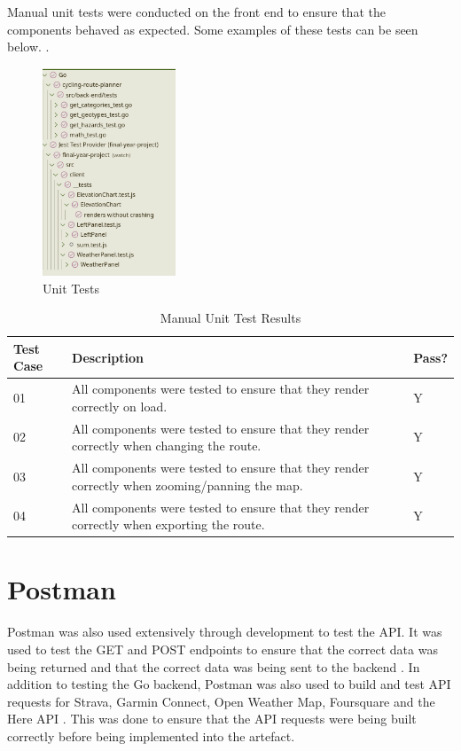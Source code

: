 Manual unit tests were conducted on the front end to ensure that the components behaved as expected. Some examples of these tests can be seen below. .

\begin{figure}[!ht]
  \centering
  \includegraphics[width=150px]{figures/unit-tests.png}
  \caption{Unit Tests}
  \label{fig:unit-tests}
\end{figure}

\begin{table}[!h]
\caption{Manual Unit Test Results}
\label{tab:unit-test-results}
\renewcommand{\arraystretch}{1.5}
\begin{tabular}{ p{1.85cm} p{10cm}  p{1.85cm} }
\hline
Test Case & Description & Pass?\\
\hline
01 & All components were tested to ensure that they render correctly on load. & Y\\
02 & All components were tested to ensure that they render correctly when changing the route. & Y\\
03 & All components were tested to ensure that they render correctly when zooming/panning the map. & Y\\
04 & All components were tested to ensure that they render correctly when exporting the route. & Y\\
\end{tabular}
\end{table}

\clearpage
\section{Postman}
\label{testing:postman}

Postman was also used extensively through development to test the API. It was used to test the GET and POST endpoints to ensure that the correct data was being returned and that the correct data was being sent to the backend . In addition to testing the Go backend, Postman was also used to build and test API requests for Strava, Garmin Connect, Open Weather Map, Foursquare and the Here API . This was done to ensure that the API requests were being built correctly before being implemented into the artefact.

